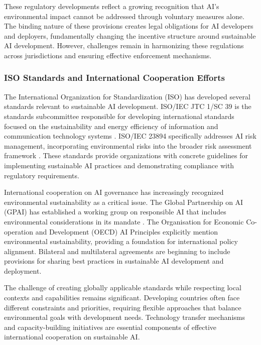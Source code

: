 \documentclass[twoside]{ai_ethics_class}
\begin{document}
These regulatory developments reflect a growing recognition that AI's environmental impact cannot be addressed through voluntary measures alone.
The binding nature of these provisions creates legal obligations for AI developers and deployers, fundamentally changing the incentive structure around sustainable AI development.
However, challenges remain in harmonizing these regulations across jurisdictions and ensuring effective enforcement mechanisms.

\subsubsection{ISO Standards and International Cooperation Efforts}

The International Organization for Standardization (ISO) has developed several standards relevant to sustainable AI development.
ISO/IEC JTC 1/SC 39 is the standards subcommittee responsible for developing international standards focused on the sustainability and energy efficiency of information and communication technology systems \cite{iso_jtc1_sc39}.
ISO/IEC 23894 specifically addresses AI risk management, incorporating environmental risks into the broader risk assessment framework \cite{iso_iec23894}.
These standards provide organizations with concrete guidelines for implementing sustainable AI practices and demonstrating compliance with regulatory requirements.

International cooperation on AI governance has increasingly recognized environmental sustainability as a critical issue.
The Global Partnership on AI (GPAI) has established a working group on responsible AI that includes environmental considerations in its mandate \cite{gpai_responsible_ai}.
The Organisation for Economic Co-operation and Development (OECD) AI Principles explicitly mention environmental sustainability, providing a foundation for international policy alignment.
Bilateral and multilateral agreements are beginning to include provisions for sharing best practices in sustainable AI development and deployment.

The challenge of creating globally applicable standards while respecting local contexts and capabilities remains significant.
Developing countries often face different constraints and priorities, requiring flexible approaches that balance environmental goals with development needs.
Technology transfer mechanisms and capacity-building initiatives are essential components of effective international cooperation on sustainable AI.
\end{document}

